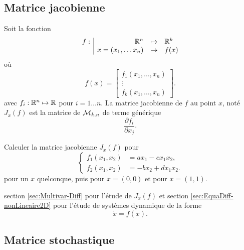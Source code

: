 \subsection{Matrice jacobienne}  \label{sec:MatJacob}

\begin{definition*}
  Soit la fonction
  $$
  \begin{array}{r|rcl}
    f : & \mathbb{R}^n & \mapsto & \mathbb{R}^k \\
    & x = (x_1, \dots x_n) & \rightarrow & f(x)
  \end{array}
  $$
  où
  $$
  f(x) = \left[\begin{array}{c}
                f_1(x_1, \dots, x_n) \\
                \vdots \\
                f_k(x_1, \dots, x_n) 
               \end{array} \right].
  $$
  avec $f_i: \mathbb{R}^n \mapsto \mathbb{R}$ pour $i = 1 \dots n$.
  La matrice jacobienne de $f$ au point $x$, noté $J_x(f)$ est la matrice de $\mathcal{M}_{k, n}$ de terme générique
  $$
  \frac{\partial f_i}{\partial x_j}.
  $$
\end{definition*}

\begin{exercise*}
  Calculer la matrice jacobienne $J_x(f)$ pour
  $$
  \left\{\begin{array}{rl}
          f_1(x_1, x_2) & = a x_1 - c x_1 x_2, \\
          f_2(x_1, x_2) & = -b x_2 + d x_1 x_2.
         \end{array} \right.
  $$
pour un $x$ quelconque, puis pour $x = (0, 0)$ et pour $x=(1, 1)$.
\end{exercise*}

\remark section \ref{sec:Multivar-Diff} pour l'étude de $J_x(f)$ et section \ref{sec:EquaDiff-nonLineaire2D} pour l'étude de systèmes dynamique de la forme
$$
\dot{x} = f(x).
$$

\subsection{Matrice stochastique}  \label{sec:MatStoch}

